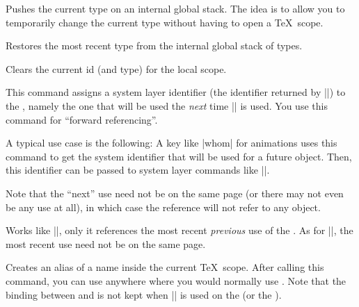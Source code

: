 \begin{command}{\pgfuseid{}}
    \begin{command}{\pgfpushtype}
        Pushes the current type on an internal global stack. The idea is to
        allow you to temporarily change the current type without having to open
        a \TeX\ scope.
    \end{command}

    \begin{command}{\pgfpoptype}
        Restores the most recent type from the internal global stack of types.
    \end{command}
\end{command}

\begin{command}{\pgfclearid}
    Clears the current id (and type) for the local scope.
\end{command}

\begin{command}{\pgfidrefnextuse{}}
    This command assigns a system layer identifier (the identifier returned by
    |\pgfsys@new@id|) to the , namely the one that will be used the
    \emph{next} time |\pgfuseid| is used. You use this command for ``forward
    referencing''.

    A typical use case is the following: A key like |whom| for animations uses
    this command to get the system identifier that will be used for a future
    object. Then, this identifier can be passed to system layer commands like
    |\pgfsys@animation@whom|.

    Note that the ``next'' use need not be on the same page (or there may not
    even be any use at all), in which case the reference will not refer to any
    object.
\end{command}

\begin{command}{\pgfidrefprevuse{}}
    Works like |\pgfidrefnextuse|, only it references the most recent
    \emph{previous} use of the . As for |\pgfidrefnextuse|, the most
    recent use need not be on the same page.
\end{command}

\begin{command}{\pgfaliasid{}}
    Creates an alias of a name inside the current \TeX\ scope. After calling
    this command, you can use  anywhere where you would normally
    use . Note that the binding between  and 
    is not kept when |\pgfuseid| is used on the  (or the
    ).
\end{command}

